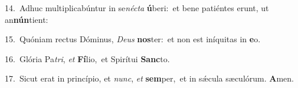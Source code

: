 {\numbfont\textcolor{\numbcolor}{14.}}~Adhuc multiplicabúntur in se\-\textit{néc}\-\textit{ta} \textbf{ú}\-beri:~\star et bene patiéntes erunt, ut an\-\textbf{nún}\-tient:\par
{\numbfont\textcolor{\numbcolor}{15.}}~Quóniam rectus Dóminus, \textit{De}\-\textit{us} \textbf{nos}\-ter:~\star et non est iníquitas in \textbf{e}\-o.\par
{\numbfont\textcolor{\numbcolor}{16.}}~Glória Pa\-\textit{tri}\-, \textit{et} \textbf{Fí}\-lio,~\star et Spirítui \textbf{Sanc}\-to.\par
{\numbfont\textcolor{\numbcolor}{17.}}~Sicut erat in princípio, et \textit{nunc}\-, \textit{et} \textbf{sem}\-per,~\star et in sǽcula sæculórum. \textbf{A}\-men.\par
